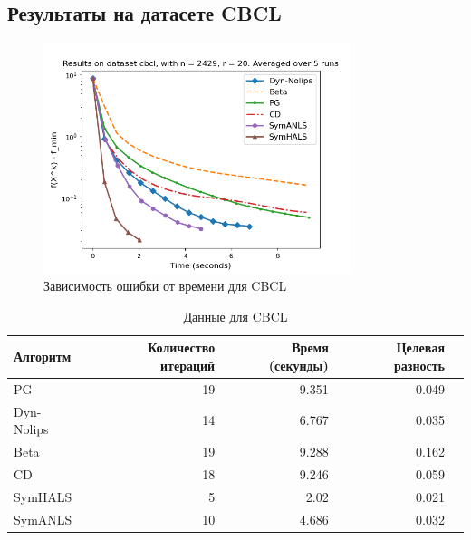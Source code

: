 \documentclass[a4paper,11pt]{article}
\begin{document}
\subsection{Результаты на датасете CBCL}
\begin{figure}[h!]
    \centering \includegraphics[width=0.8\textwidth]{my_plot_cbcl.png}
    \caption{Зависимость ошибки от времени для CBCL}
    \label{fig:cbcl}
\end{figure}
\begin{table}[h!]
    \centering
    \caption{Данные для CBCL}
    \label{tab:clustering_accuracy_cbcl}
    \begin{tabular}{|l|r|r|r|r|}
        \hline
        Алгоритм & Количество итераций & Время (секунды) & Целевая разность \\
        \hline
        PG & 19 & 9.351 & 0.049 \\
        Dyn-Nolips & 14 & 6.767 & 0.035 \\
        Beta & 19 & 9.288 & 0.162 \\
        CD & 18 & 9.246 & 0.059 \\
        SymHALS & 5 & 2.02 & 0.021 \\
        SymANLS & 10 & 4.686 & 0.032 \\
        \hline
    \end{tabular}
    \end{table}
\newpage
\end{document}
